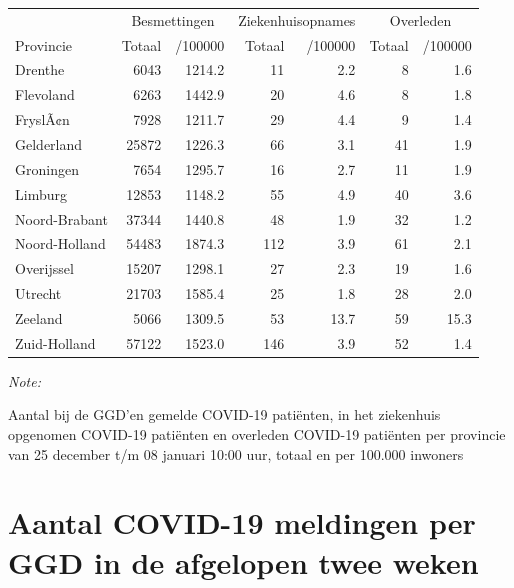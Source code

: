 \documentclass[
  english,
  man,floatsintext]{apa6}
\begin{document}
\begin{table}
\centering
\begin{threeparttable}
\begin{tabular}{lrrrrrr}
\toprule
\multicolumn{1}{c}{ } & \multicolumn{2}{c}{Besmettingen} & \multicolumn{2}{c}{Ziekenhuisopnames} & \multicolumn{2}{c}{Overleden} \\
\cmidrule(l{3pt}r{3pt}){2-3} \cmidrule(l{3pt}r{3pt}){4-5} \cmidrule(l{3pt}r{3pt}){6-7}
Provincie & Totaal & /100000 & Totaal & /100000 & Totaal & /100000\\
\midrule
Drenthe & 6043 & 1214.2 & 11 & 2.2 & 8 & 1.6\\
Flevoland & 6263 & 1442.9 & 20 & 4.6 & 8 & 1.8\\
FryslÃ¢n & 7928 & 1211.7 & 29 & 4.4 & 9 & 1.4\\
Gelderland & 25872 & 1226.3 & 66 & 3.1 & 41 & 1.9\\
Groningen & 7654 & 1295.7 & 16 & 2.7 & 11 & 1.9\\
Limburg & 12853 & 1148.2 & 55 & 4.9 & 40 & 3.6\\
Noord-Brabant & 37344 & 1440.8 & 48 & 1.9 & 32 & 1.2\\
Noord-Holland & 54483 & 1874.3 & 112 & 3.9 & 61 & 2.1\\
Overijssel & 15207 & 1298.1 & 27 & 2.3 & 19 & 1.6\\
Utrecht & 21703 & 1585.4 & 25 & 1.8 & 28 & 2.0\\
Zeeland & 5066 & 1309.5 & 53 & 13.7 & 59 & 15.3\\
Zuid-Holland & 57122 & 1523.0 & 146 & 3.9 & 52 & 1.4\\
\bottomrule
\end{tabular}
\begin{tablenotes}
\item \textit{Note: } 
\item Aantal bij de GGD’en gemelde COVID-19 patiënten, in het ziekenhuis opgenomen COVID-19 patiënten en overleden COVID-19 patiënten per provincie van 25 december t/m 08 januari 10:00 uur, totaal en per 100.000 inwoners
\end{tablenotes}
\end{threeparttable}
\end{table}

\newpage

\hypertarget{aantal-covid-19-meldingen-per-ggd-in-de-afgelopen-twee-weken}{%
\section{Aantal COVID-19 meldingen per GGD in de afgelopen twee weken}\label{aantal-covid-19-meldingen-per-ggd-in-de-afgelopen-twee-weken}}
\end{document}
